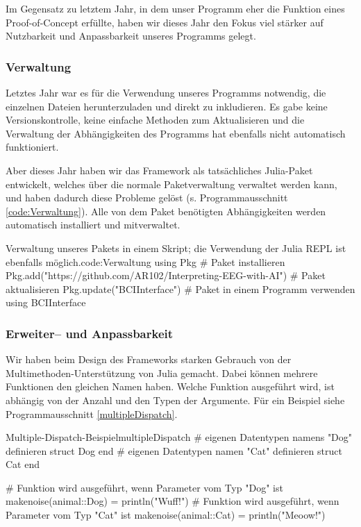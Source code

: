 \documentclass[10pt]{article}
\newcommand{\coderef}[1]{Programmausschnitt \ref{#1}}
\begin{document}
Im Gegensatz zu letztem Jahr, in dem unser Programm eher die Funktion eines Proof-of-Concept erfüllte, haben wir dieses Jahr den Fokus viel stärker auf Nutzbarkeit und Anpassbarkeit unseres Programms gelegt.

\subsubsection{Verwaltung}

Letztes Jahr war es für die Verwendung unseres Programms notwendig, die einzelnen Dateien herunterzuladen und direkt zu inkludieren.
Es gabe keine Versionskontrolle, keine einfache Methoden zum Aktualisieren und die Verwaltung der Abhängigkeiten des Programms hat ebenfalls nicht automatisch funktioniert.

Aber dieses Jahr haben wir das Framework als tatsächliches Julia-Paket entwickelt, welches über die normale Paketverwaltung verwaltet werden kann, und haben dadurch diese Probleme gelöst (s. \coderef{code:Verwaltung}).
Alle von dem Paket benötigten Abhängigkeiten werden automatisch installiert und mitverwaltet.

\begin{code}[0.75]{Verwaltung unseres Pakets in einem Skript; die Verwendung der Julia REPL ist ebenfalls möglich.}{code:Verwaltung}
    using Pkg
    # Paket installieren
    Pkg.add("https://github.com/AR102/Interpreting-EEG-with-AI")
    # Paket aktualisieren
    Pkg.update("BCIInterface")
    # Paket in einem Programm verwenden
    using BCIInterface
\end{code}

\subsubsection{Erweiter-- und Anpassbarkeit}

Wir haben beim Design des Frameworks starken Gebrauch von der Multimethoden-Unterstützung von Julia gemacht.
Dabei können mehrere Funktionen den gleichen Namen haben. Welche Funktion ausgeführt wird, ist abhängig von der Anzahl und den Typen der Argumente. Für ein Beispiel siehe \coderef{multipleDispatch}.

\begin{code}{Multiple-Dispatch-Beispiel}{multipleDispatch}
# eigenen Datentypen namens "Dog" definieren
struct Dog end
# eigenen Datentypen namen "Cat" definieren
struct Cat end

# Funktion wird ausgeführt, wenn Parameter vom Typ "Dog" ist
makenoise(animal::Dog) = println("Wuff!")
# Funktion wird ausgeführt, wenn Parameter vom Typ "Cat" ist
makenoise(animal::Cat) = println("Meoow!")
\end{code}
\end{document}
